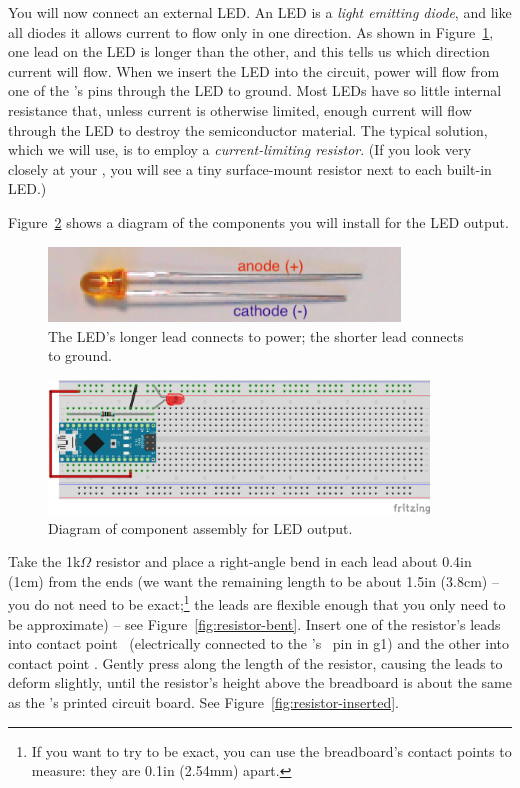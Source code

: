 You will now connect an external LED. An LED is a \textit{light emitting diode}, and like all diodes it allows current to flow only in one direction.
As shown in Figure~\ref{fig:led-annotated}, one lead on the LED is longer than the other, and this tells us which direction current will flow.
When we insert the LED into the circuit, power will flow from one of the \developmentboard's pins through the LED to ground.
Most LEDs have so little internal resistance that, unless current is otherwise limited, enough current will flow through the LED to destroy the semiconductor material.
The typical solution, which we will use, is to employ a \textit{current-limiting resistor}.
(If you look very closely at your \developmentboard, you will see a tiny surface-mount resistor next to each built-in LED.)

Figure~\ref{fig:led-diagram} shows a diagram of the components you will install for the LED output.

\begin{figure}
    \centering
    \includegraphics[height=2cm]{direct/led/led-annotated}
    \caption{The LED's longer lead connects to power; the shorter lead connects to ground.\label{fig:led-annotated}}
\end{figure}

\begin{figure}
    \centering
    \includegraphics[width=0.9\textwidth]{fritzing_diagrams/led}
    \caption{Diagram of component assembly for LED output. \label{fig:led-diagram}}
\end{figure}

Take the 1k$\Omega$ resistor and place a right-angle bend in each lead about 0.4in (1cm) from the ends (we want the remaining length to be about 1.5in (3.8cm) -- you do not need to be exact;\footnote{If you want to try to be exact, you can use the breadboard's contact points to measure: they are 0.1in (2.54mm) apart.}
the leads are flexible enough that you only need to be approximate) -- see Figure~\ref{fig:resistor-bent}.
Insert one of the resistor's leads into contact point \resistorcontactpointone\ (electrically connected to the \developmentboard's \ledpin\ pin in g1) and the other into contact point \resistorcontactpointtwo.
Gently press along the length of the resistor, causing the leads to deform slightly, until the resistor's height above the breadboard is about the same as the \developmentboard's printed circuit board.
See Figure~\ref{fig:resistor-inserted}.

